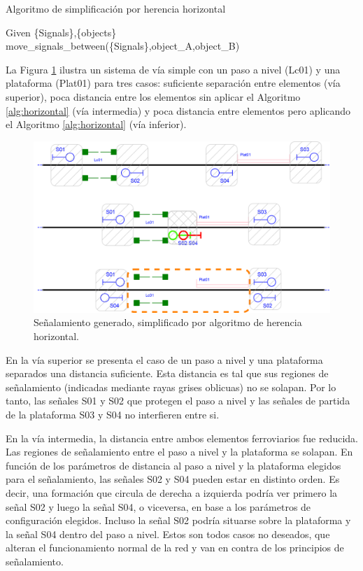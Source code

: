 \begin{algorithm}[H]
	\caption{Algoritmo de simplificación por herencia horizontal}
	\label{alg:horizontal}
	\DontPrintSemicolon
	\SetNoFillComment
	\LinesNotNumbered 
	Given \{Signals\},\{objects\}\\
	{
		{
			{
				{
					move\_signals\_between(\{Signals\},object\_A,object\_B)
				}
			}
		}
	}
\end{algorithm}

La Figura \ref{fig:signal_horizontal} ilustra un sistema de vía simple con un paso a nivel (Lc01) y una plataforma (Plat01) para tres casos: suficiente separación entre elementos (vía superior), poca distancia entre los elementos sin aplicar el Algoritmo \ref{alg:horizontal} (vía intermedia) y poca distancia entre elementos pero aplicando el Algoritmo \ref{alg:horizontal} (vía inferior).

\begin{figure}[H]
	\centering
	\includegraphics[width=1\textwidth]{Figuras/proximity.PNG}
	\centering\caption{Señalamiento generado, simplificado por algoritmo de herencia horizontal.}
	\label{fig:signal_horizontal}
\end{figure}

En la vía superior se presenta el caso de un paso a nivel y una plataforma separados una distancia suficiente. Esta distancia es tal que sus regiones de señalamiento (indicadas mediante rayas grises oblicuas) no se solapan. Por lo tanto, las señales S01 y S02 que protegen el paso a nivel y las señales de partida de la plataforma S03 y S04 no interfieren entre si.

En la vía intermedia, la distancia entre ambos elementos ferroviarios fue reducida. Las regiones de señalamiento entre el paso a nivel y la plataforma se solapan. En función de los parámetros de distancia al paso a nivel y la plataforma elegidos para el señalamiento, las señales S02 y S04 pueden estar en distinto orden. Es decir, una formación que circula de derecha a izquierda podría ver primero la señal S02 y luego la señal S04, o viceversa, en base a los parámetros de configuración elegidos. Incluso la señal S02 podría situarse sobre la plataforma y la señal S04 dentro del paso a nivel. Estos son todos casos no deseados, que alteran el funcionamiento normal de la red y van en contra de los principios de señalamiento.

